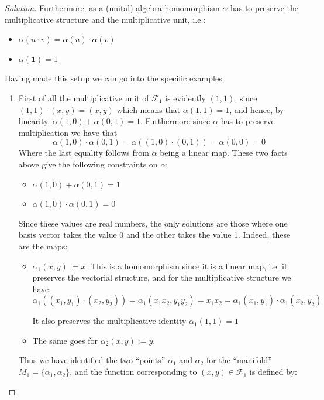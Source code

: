 \documentclass[11pt,a4paper]{article}
\theoremstyle{plain}
\theoremstyle{definition}
\theoremstyle{remark}
\newenvironment{solution}
  {\begin{proof}[Solution]}
  {\end{proof}}
\newcommand{\F}{\mathcal{F}}            %
\begin{document}
\begin{solution}
Furthermore, as a (unital) algebra homomorphism $\alpha$ has to preserve the multiplicative structure and the multiplicative unit, i.e.:

\begin{itemize}
  \item $\alpha(u\cdot v)= \alpha(u)\cdot \alpha(v)$
  \item $\alpha(\mathbf{1})=1$
\end{itemize}

Having made this setup we can go into the specific examples.
\begin{enumerate}
  \item First of all the multiplicative unit of $\F_1$ is evidently $(1,1)$, since $(1,1)\cdot (x,y)=(x,y)$ which means that $\alpha(1,1)=1$, and hence, by linearity, $\alpha(1,0)+\alpha(0,1)=1$. Furthermore since $\alpha$ has to preserve multiplication we have that 
    $$\alpha(1,0)\cdot \alpha(0,1)=\alpha((1,0)\cdot (0,1))=\alpha(0,0)=0$$
  Where the last equality follows from $\alpha$ being a linear map. These two facts above give the following constraints on $\alpha$:

  \begin{itemize}
    \item $\alpha(1,0)+\alpha(0,1)=1$
    \item $\alpha(1,0)\cdot\alpha(0,1)=0$
  \end{itemize}

  Since these values are real numbers, the only solutions are those where one basis vector takes the value 0 and the other takes the value 1. Indeed, these are the maps:
    \begin{itemize}
      \item $\alpha_1(x,y):=x$. This is a homomorphism since it is a linear map, i.e. it preserves the vectorial structure, and for the multiplicative structure we have:
        $$
          \alpha_1((x_1,y_1)\cdot(x_2,y_2)) = \alpha_1(x_1 x_2,y_1 y_2)=x_1x_2= \alpha_1(x_1,y_1)
          \cdot\alpha_1(x_2,y_2)$$ 
        
      It also preserves the multiplicative identity $\alpha_1(1,1)=1$
    \item The same goes for $\alpha_2(x,y):=y$.


    \end{itemize}

    Thus we have identified the two ``points'' $\alpha_1$ and $\alpha_2$ for the ``manifold'' $M_1=\{\alpha_1, \alpha_2\}$, and the function corresponding to $(x,y)\in \F_1$ is defined by:


\end{enumerate}
\end{solution}
\end{document}
